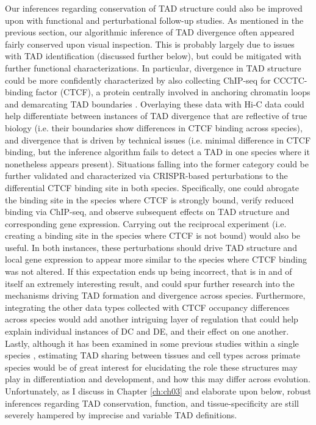 Our inferences regarding conservation of TAD structure could also be improved upon with functional and perturbational follow-up studies. As mentioned in the previous section, our algorithmic inference of TAD divergence often appeared fairly conserved upon visual inspection. This is probably largely due to issues with TAD identification (discussed further below), but could be mitigated with further functional characterizations. In particular, divergence in TAD structure could be more confidently characterized by also collecting ChIP-seq for CCCTC-binding factor (CTCF), a protein centrally involved in anchoring chromatin loops and demarcating TAD boundaries \cite{Rao.2014, Zuin.2014, Phillips-Cremins.2013, Dixon.2012, Nora.2012}. Overlaying these data with Hi-C data could help differentiate between instances of TAD divergence that are reflective of true biology (i.e. their boundaries show differences in CTCF binding across species), and divergence that is driven by technical issues (i.e. minimal difference in CTCF binding, but the inference algorithm fails to detect a TAD in one species where it nonetheless appears present). Situations falling into the former category could be further validated and characterized via CRISPR-based perturbations to the differential CTCF binding site in both species. Specifically, one could abrogate the binding site in the species where CTCF is strongly bound, verify reduced binding via ChIP-seq, and observe subsequent effects on TAD structure and corresponding gene expression. Carrying out the reciprocal experiment (i.e. creating a binding site in the species where CTCF is not bound) would also be useful. In both instances, these perturbations should drive TAD structure and local gene expression to appear more similar to the species where CTCF binding was not altered. If this expectation ends up being incorrect, that is in and of itself an extremely interesting result, and could spur further research into the mechanisms driving TAD formation and divergence across species. Furthermore, integrating the other data types collected with CTCF occupancy differences across species would add another intriguing layer of regulation that could help explain individual instances of DC and DE, and their effect on one another. Lastly, although it has been examined in some previous studies within a single species \cite{Sauerwald.2019, Sauerwald.2018, Schmitt.2016, Dixon.2015}, estimating TAD sharing between tissues and cell types across primate species would be of great interest for elucidating the role these structures may play in differentiation and development, and how this may differ across evolution. Unfortunately, as I discuss in Chapter \ref{ch:ch03} and elaborate upon below, robust inferences regarding TAD conservation, function, and tissue-specificity are still severely hampered by imprecise and variable TAD definitions.

